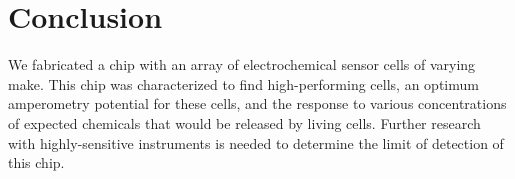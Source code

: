 \chapter{Conclusion}

We fabricated a chip with an array of electrochemical sensor cells of varying make. This chip was characterized to find high-performing cells, an optimum amperometry potential for these cells, and the response to various concentrations of expected chemicals that would be released by living cells. Further research with highly-sensitive instruments is needed to determine the limit of detection of this chip.